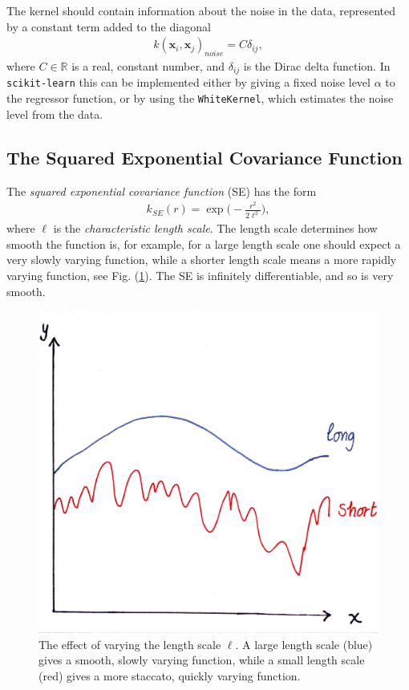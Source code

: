 \documentclass[twoside,english]{uiofysmaster}
\begin{document}
The kernel should contain information about the noise in the data, represented by a constant term added to the diagonal
\begin{align}
k(\textbf{x}_i, \textbf{x}_j)_{noise} = C \delta_{ij},
\end{align}
where $C \in \mathbb{R}$ is a real, constant number, and $\delta_{ij}$ is the Dirac delta function. In \verb|scikit-learn| this can be implemented either by giving a fixed noise level $\alpha$ to the regressor function, or by using the \verb|WhiteKernel|, which estimates the noise level from the data.

\subsection{The Squared Exponential Covariance Function}

The \textit{squared exponential covariance function} (SE) has the form 
\begin{align}
k_{SE} (r) = \exp \Big( - \frac{r^2}{2 \ell^2} \Big),
\end{align} 
where $\ell$ is the \textit{characteristic length scale}. The length scale determines how smooth the function is, for example, for a large length scale one should expect a very slowly varying function, while a shorter length scale means a more rapidly varying function, see Fig. (\ref{Fig:: gaussian process : ell variation example}). The SE is infinitely differentiable, and so is very smooth. 

\begin{figure}
\centering
\includegraphics[scale=0.1]{GP_illustration_ell.jpg}
\caption{The effect of varying the length scale $\ell$. A large length scale (blue) gives a smooth, slowly varying function, while a small length scale (red) gives a more staccato, quickly varying function.}
\label{Fig:: gaussian process : ell variation example}
\end{figure}
\end{document}
